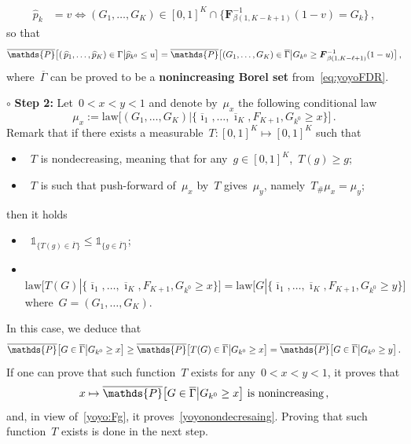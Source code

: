 \documentclass[final,numbib]{imaiai}%
\numberwithin{equation}{section}
\def\eq{\begin{equation}}
\def\qe{\end{equation}}
\def\cD{\mathcal{D}}
\def\cS{\mathcal{S}}
\def\bF{\boldsymbol{F}}
\def\bbP{\mathds{P}}
\renewcommand{\bar}{\overline}
\renewcommand{\hat}{\widehat}
\def\\bUnif{\text{\bUnif}}
\newcommand{\<}{\langle}
\renewcommand{\>}{\rangle}
\newcommand{\1}{\mathds{1}}
\begin{document}
{\begin{align*}
\hat p_k &= v
\Leftrightarrow
(G_1,\ldots,G_K)\in %
{[0,1]^K\cap\{\bF_{\beta(1,K-k+1)}^{-1}(1-v)= G_k\}
}
\,,
\end{align*}
so that 
\eq
\label{yoyo:Fg}
\bar\bbP\big[(\,\hat p_1,\ldots,\hat p_K)\in\Gamma\big|\hat p_{k^0}\leq u\big]=\bar\bbP\big[(G_1,\ldots,G_K)\in\bar\Gamma\big|G_{k^0}\geq \bF_{\beta(1,K-\ell+1)}^{-1}(1-u)\big]\,,
\qe
where~$\bar\Gamma$ can be proved to be a {\bf nonincreasing Borel set} from~\eqref{eq:yoyoFDR}. 


\medskip

\noindent
 {$\circ$ \bf Step 2: }
 Let~$0<x<y<1$ and denote by~$\mu_x$ the following conditional law  
 \[
 \mu_x:=\mathrm{law}\big[(G_1,\ldots,G_K)|\{\bar \imath_1,\ldots,\bar \imath_K,F_{K+1},G_{k^0}\geq x\}\big]\,.
 \] 
 Remark that if there exists a measurable~$T:[0,1]^K\mapsto [0,1]^K$ such that 
 \begin{itemize}
 \item~$T$ is nondecreasing, meaning that for any~$g\in[0,1]^K$,~$T(g)\geq g$;
 \item~$T$ is such that push-forward of~$\mu_x$ by~$T$ gives~$\mu_y$, namely~$T_\#\mu_x=\mu_y$;
 \end{itemize}
then it holds
 \begin{itemize}
 \item~$\mathds 1_{\{T(g)\in\bar\Gamma\}}\leq\mathds 1_{\{g\in\bar\Gamma\}}$;
 \item~$\mathrm{law}\big[T(G)|\{\bar \imath_1,\ldots,\bar \imath_K,F_{K+1},G_{k^0}\geq x\}\big]=\mathrm{law}\big[G|\{\bar \imath_1,\ldots,\bar \imath_K,F_{K+1},G_{k^0}\geq y\}\big]$ where~$G=(G_1,\ldots,G_K)$.
 \end{itemize}
In this case, we deduce that 
\[
\bar\bbP\big[G\in\bar\Gamma\big|G_{k^0}\geq x\big]
\geq
\bar\bbP\big[T(G)\in\bar\Gamma\big|G_{k^0}\geq x\big]
=
\bar\bbP\big[G\in\bar\Gamma\big|G_{k^0}\geq y\big]\,.
\]
 If one can prove that such function~$T$ exists for any~$0<x<y<1$, it proves that 
 \[
 x\mapsto \bar\bbP\big[G\in\bar\Gamma\big|G_{k^0}\geq x\big]\text{ is nonincreasing}\,,
 \]
and, in view of~\eqref{yoyo:Fg}, it proves~\eqref{yoyonondecresaing}. Proving that such function~$T$ exists is done in the next step.

}
\end{document}
